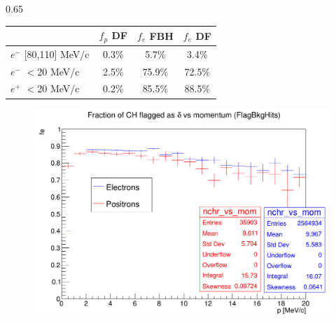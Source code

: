 \documentclass{beamer}
\begin{document}
\begin{frame}
\begin{columns}
\begin{column}{0.65\framewidth}
\begin{table}[h!]
        \end{table}
        \vspace{-6mm}
        \begin{table}[h!]
    \centering
            \hspace*{-0.5em}
    \renewcommand{\arraystretch}{0.7}
    \begin{tabular}{| l | c | c | c |} 
    \hline
    &    {\scriptsize $f_{p}$ DF} & {\scriptsize $f_{e}$ FBH } & {\scriptsize $f_{e}$ DF} \\
    \hline
    {\scriptsize $e^-$} {\tiny[80,110] MeV/c}  & {\scriptsize 0.3\%}  &  {\scriptsize 5.7\%} & {\scriptsize 3.4\%}\\
    \hline
    {\scriptsize $e^-$} {\tiny$<$20 MeV/c}      & {\scriptsize 2.5\%}   & {\scriptsize 75.9\%} & {\scriptsize 72.5\%}\\
    \hline
    {\scriptsize $e^+$} {\tiny$<$20 MeV/c} & {\scriptsize 0.2\%}    &   {\scriptsize 85.5\%}& {\scriptsize 88.5\%}\\
    \hline
  

    \end{tabular}
    
    \end{table}
   
    \begin{figure}[!h]
        \centering
        \hspace*{-2.1em}
        \includegraphics[width =0.8\columnwidth]{figures/png/Screenshot_20240818_155835.png}
       \label{fig:0pbarbefore0}
\end{figure}

 
   
       
\end{column}
\end{columns}

       
   
   
\end{frame}
\end{document}
